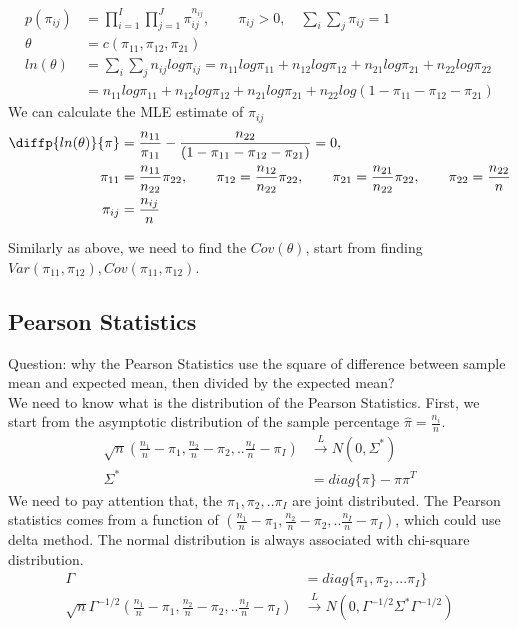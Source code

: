 	\begin{align*}
		p(\pi_{ij}) &= \prod_{i=1}^I \prod_{j=1}^J \pi_{ij}^{n_{ij}}, \qquad \pi_{ij} >0, \quad \sum_{i}\sum_{j} \pi_{ij} = 1 \\
		\theta &= c(\pi_{11}, \pi_{12}, \pi_{21})\\
		ln(\theta) &=  \sum_{i}\sum_{j} n_{ij} log \pi_{ij} = n_{11} log\pi_{11} + n_{12} log \pi_{12} + n_{21} log \pi_{21} + n_{22} log \pi_{22}\\
		&= n_{11} log \pi_{11} + n_{12} log \pi_{12} + n_{21} log \pi_{21} + n_{22} log (1- \pi_{11} - \pi_{12} - \pi_{21})
	\end{align*}
	We can calculate the MLE estimate of $\pi_{ij}$ 
	\begin{align*}
		\diffp{ln(\theta)}{\pi} &=  \frac{n_{11}}{\pi_{11}} - \frac{n_{22}}{(1- \pi_{11} - \pi_{12} - \pi_{21})} = 0, \\
		\qquad \pi_{11} &= \frac{n_{11}}{n_{22}}\pi_{22}, \qquad  \pi_{12} = \frac{n_{12}}{n_{22}}\pi_{22}, \qquad \pi_{21} = \frac{n_{21}}{n_{22}}\pi_{22}, \qquad \pi_{22} = \frac{n_{22}}{n}\\
	\pi_{ij} &= \frac{n_{ij}}{n}
	\end{align*}

	Similarly as above, we need to find the $Cov(\theta)$, start from finding $Var(\pi_{11}, \pi_{12}), Cov(\pi_{11}, \pi_{12})$.

	\subsection{Pearson Statistics}
	Question: why the Pearson Statistics use the square of difference between sample mean and expected mean, then divided by the expected mean? \\
	
	We need to know what is the distribution of the Pearson Statistics. First, we start from the asymptotic distribution of the sample percentage $\hat{\pi} = \frac{n_i}{n}$.
	\begin{align*}
		\sqrt{n} (\frac{n_1}{n} - \pi_1, \frac{n_2}{n} - \pi_2, ..\frac{n_I}{n}-\pi_I) & \xrightarrow{L} N(0, \Sigma^{\ast})\\
		\Sigma^{\ast} &= diag\{ \pi\} - \pi \pi^T
	\end{align*}
We need to pay attention that, the $\pi_1, \pi_2, .. \pi_I$ are joint distributed. The Pearson statistics comes from a function of $(\frac{n_1}{n} - \pi_1, \frac{n_2}{n} - \pi_2, ..\frac{n_I}{n}-\pi_I)$, which could use delta method. The normal distribution is always associated with chi-square distribution. \\
	\begin{align*}
		\Gamma &= diag\{ \pi_1, \pi_2,... \pi_I \} \\
		\sqrt{n} \Gamma^{-1/2} \left(\frac{n_1}{n} - \pi_1, \frac{n_2}{n} - \pi_2, ..\frac{n_I}{n}-\pi_I \right) & \xrightarrow{L} N(0, \Gamma^{-1/2} \Sigma^{\ast} \Gamma^{-1/2})
	\end{align*}
	

